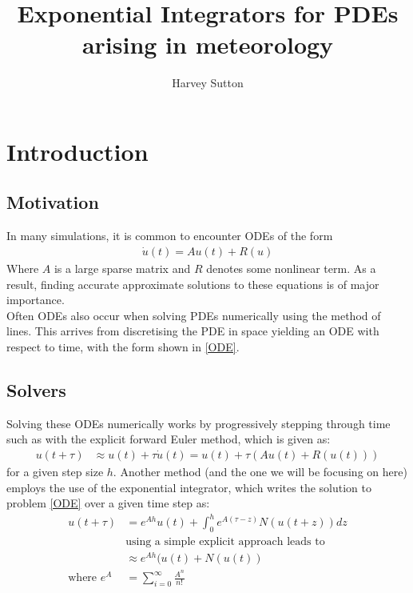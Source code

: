 \documentclass{article}
\begin{document}
\title{Exponential Integrators for PDEs arising in meteorology} 
\maketitle
\author{Harvey Sutton}

\tableofcontents
\newpage

\section {Introduction}
\subsection{Motivation}
In many simulations, it is common to encounter ODEs of the form
\begin{align}
\dot u(t) = Au(t) + R(u) \label{ODE}
\end{align}
Where $A$ is a large sparse matrix and $R$ denotes some nonlinear term.
As a result, finding accurate approximate solutions to these equations is of major importance.\\

Often ODEs also occur when solving PDEs numerically using the method of lines.
This arrives from discretising the PDE in space yielding an ODE with respect to time, with the form shown in \eqref{ODE}.\\
\subsection{Solvers}
Solving these ODEs numerically works by progressively stepping through time such as with the explicit forward Euler method, which is given as:
\begin{align*}
u(t+\tau) &\approx u(t) + \tau\dot u(t) = u(t) + \tau(Au(t) + R(u(t)))
\end{align*}
for a given step size $h$.
Another method (and the one we will be focusing on here) employs the use of the exponential integrator, which writes the solution to problem \eqref{ODE} over a given time step as:
\begin{align*}
u(t+\tau) &= e^{Ah}u(t) + \int_0^h e^{A(\tau-z)}N(u(t+z)) dz \label{ODE Solution}\\
&\text{using a simple explicit approach leads to}\\
&\approx e^{Ah}(u(t) + N(u(t))\\
\text{where } e^{A} &= \sum^{\infty}_{i = 0}\frac{A^n}{n!}
\end{align*}
\end{document}

